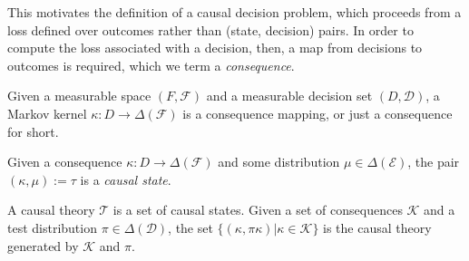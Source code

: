 This motivates the definition of a causal decision problem, which proceeds from a loss defined over outcomes rather than (state, decision) pairs. In order to compute the loss associated with a decision, then, a map from decisions to outcomes is required, which we term a \emph{consequence}. 

\begin{definition}[Consequences]
Given a measurable space $(F,\mathcal{F})$ and a measurable decision set $(D,\mathcal{D})$, a Markov kernel $\kappa:D \to \Delta(\mathcal{F})$ is a consequence mapping, or just a consequence for short.
\end{definition}

\begin{definition}
Given a consequence $\kappa:D\to \Delta(\mathcal{F})$ and some distribution $\mu\in \Delta(\mathcal{E})$, the pair $(\kappa,\mu):=\tau$ is a \emph{causal state}.
\end{definition}

\begin{definition}\label{def:causal_theory}
A causal theory $\mathscr{T}$ is a set of causal states. Given a set of consequences $\mathscr{K}$ and a test distribution $\pi\in \Delta(\mathcal{D})$, the set $\{(\kappa,\pi\kappa)|\kappa\in \mathscr{K}\}$ is the causal theory generated by $\mathscr{K}$ and $\pi$.
\end{definition}

